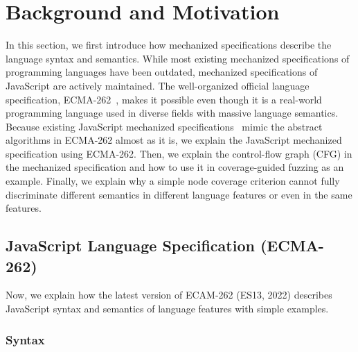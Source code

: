 \section{Background and Motivation}\label{sec:motivation}

In this section, we first introduce how mechanized specifications describe the
language syntax and semantics.
%
While most existing mechanized specifications of programming languages have been
outdated, mechanized specifications of JavaScript are actively maintained.
%
The well-organized official language specification, ECMA-262~\cite{es13}, makes
it possible even though it is a real-world programming language used in diverse
fields with massive language semantics.
%
Because existing JavaScript mechanized specifications~\cite{kjs, javert, jiset,
skel-js} mimic the abstract algorithms in ECMA-262 almost as it is, we explain
the JavaScript mechanized specification using ECMA-262.
%
Then, we explain the control-flow graph (CFG) in the mechanized specification
and how to use it in coverage-guided fuzzing as an example.
%
Finally, we explain why a simple node coverage criterion cannot fully
discriminate different semantics in different language features or even in the
same features.


\subsection{JavaScript Language Specification (ECMA-262)}\label{sec:ecma-262}

Now, we explain how the latest version of ECAM-262 (ES13, 2022) describes
JavaScript syntax and semantics of language features with simple examples. 


\subsubsection{Syntax}\label{sec:syntax}

